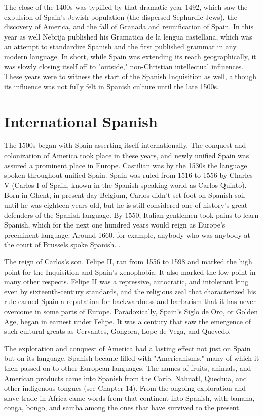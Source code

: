The close of the 1400s was typified by that dramatic year
1492, which saw the expulsion of Spain's Jewish population (the dispersed Sephardic Jews), the discovery of America, and the fall of Granada and reunification of Spain. In this year as well Nebrija published
his Gramatica de la lengua castellana, which was an attempt to standardize Spanish and the first published grammar in any modern language. In short, while Spain was extending its reach geographically, it
was slowly closing itself off to "outside," non-Christian intellectual influences. These years were to witness the start of the Spanish Inquisition as well, although its influence was not fully felt in Spanish culture until the late 1500s.

\section{International Spanish}

The 1500s began with Spain asserting itself internationally.
The conquest and colonization of America took place in these years,
and newly unified Spain was assured a prominent place in Europe.
Castilian was by the 1530s the language spoken throughout unified
Spain. Spain was ruled from 1516 to 1556 by Charles V (Carlos I of
Spain, known in the Spanish-speaking world as Carlos Quinto). Born
in Ghent, in present-day Belgium, Carlos didn't set foot on Spanish
soil until he was eighteen years old, but he is still considered one of
history's great defenders of the Spanish language. By 1550, Italian gentlemen took pains to learn Spanish, which for the next one hundred
years would reign as Europe's preeminent language. Around 1660, for
example, anybody who was anybody at the court of Brussels spoke
Spanish. .

The reign of Carlos's son, Felipe II, ran from 1556 to 1598 and
marked the high point for the Inquisition and Spain's xenophobia. It
also marked the low point in many other respects. Felipe II was a repressive, autocratic, and intolerant king even by sixteenth-century
standards, and the religious zeal that characterized his rule earned
Spain a reputation for backwardness and barbarism that it has never
overcome in some parts of Europe. Paradoxically, Spain's Siglo de Oro,
or Golden Age, began in earnest under Felipe. It was a century that saw
the emergence of such cultural greats as Cervantes, Gongora, Lope de
Vega, and Quevedo.

The exploration and conquest of America had a lasting effect
not just on Spain but on its language. Spanish became filled with
"Americanisms," many of which it then passed on to other European
languages. The names of fruits, animals, and American products came
into Spanish from the Carib, Nahuatl, Quechua, and other indigenous
tongues (see Chapter 14). From the ongoing exploration and slave trade
in Africa came words from that continent into Spanish, with banana,
conga, bongo, and samba among the ones that have survived to the
present.

